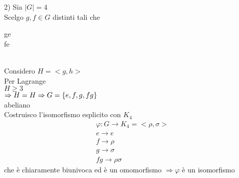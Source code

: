 \documentclass[12px]{article}
\begin{document}
		2) Sia $|G| = 4$\\
		Scelgo  $g,f\in G$ distinti tali che \begin{cases}
			g\neq e\\
			f\neq e
		\end{cases}\\
		Considero $H = <g,h>$ \\
		Per Lagrange\\
		$H \geq 3$\\
		$ \Rightarrow H = H\\
		\Rightarrow G = \{e,f,g,fg\}$\\
		abeliano\\
		Costruisco l'isomorfismo esplicito con $K_4$\\
		\begin{gather*}
			\varphi:G \rightarrow K_4 = <\rho,\sigma>\\
			e \rightarrow e\\
			f \rightarrow\rho\\
			g \rightarrow\sigma\\
			fg \rightarrow\rho\sigma
		\end{gather*}
		che è chiaramente biunivoca ed è un omomorfismo $ \Rightarrow \varphi$ è un isomorfismo
\end{document}
